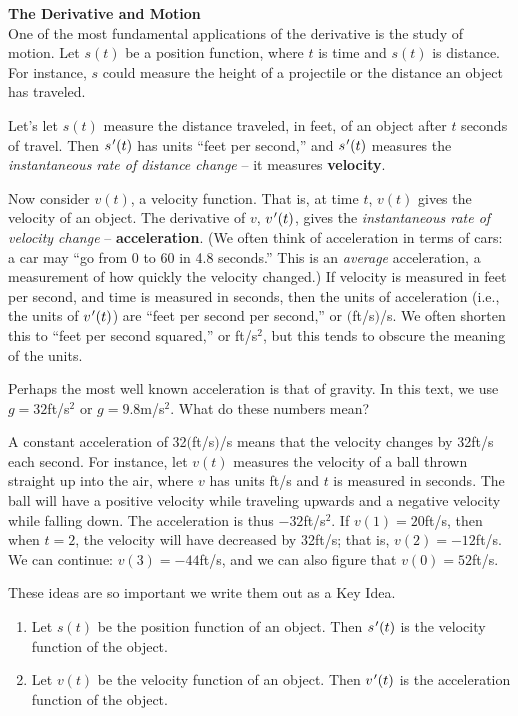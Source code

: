 \noindent\textbf{\large The Derivative and Motion}\\

One of the most fundamental applications of the derivative is the study of motion. Let $s(t)$ be a position function, where $t$ is time and $s(t)$ is  distance. For instance, $s$ could measure the height of a projectile or the distance an object has traveled. 

Let's let $s(t)$ measure the distance traveled, in feet, of an object after $t$ seconds of travel. Then $s\hskip.75pt'(t)$ has units ``feet per second,'' and $s\hskip.75pt'(t)$ measures the \textit{instantaneous rate of distance change} -- it measures \textbf{velocity}. 

Now consider $v(t)$, a velocity function. That is, at time $t$, $v(t)$ gives the velocity of an object. The derivative of $v$, $v\hskip.75pt'(t)$, gives the \textit{instantaneous rate of velocity change} --
\textbf{acceleration}. (We often think of acceleration in terms of cars: a car may ``go from 0 to 60 in 4.8 seconds.'' This is an \textit{average} acceleration, a measurement of how quickly the velocity changed.) If velocity is measured in feet per second, and time is measured in seconds, then the units of acceleration (i.e., the units of $v\hskip.75pt'(t)$) are ``feet per second per second,'' or $($ft/s$)$/s. We often shorten this to ``feet per second squared,'' or ft/s$^2$, but this tends to obscure the meaning of the units.

Perhaps the most well known acceleration is that of gravity. In this text, we use $g=32$ft/s$^2$ or $g=9.8$m/s$^2$. What do these numbers mean?

A constant acceleration of 32$($ft/s$)$/s means that the velocity changes by 32ft/s each second. For instance, let $v(t)$ measures the velocity of a ball thrown straight up into the air, where $v$ has units ft/s and $t$ is measured in seconds. The ball will have a positive velocity while traveling upwards and a negative velocity while falling down. The acceleration is thus $-32$ft/s$^2$. If $v(1) = 20$ft/s, then when $t=2$, the velocity will have decreased by 32ft/s; that is, $v(2) = -12$ft/s. We can continue: $v(3) = -44$ft/s, and we can also figure that $v(0) = 52$ft/s.

These ideas are so important we write them out as a Key Idea.

{\begin{enumerate}
	\item Let $s(t)$ be the position function of an object. Then $s\hskip.75pt'(t)$ is the velocity function of the object.
	\item	Let $v(t)$ be the velocity function of an object. Then $v\hskip.75pt'(t)$ is the acceleration function of the object.
\end{enumerate}
}

